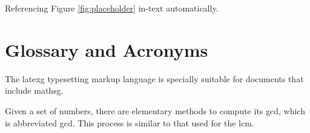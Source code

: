 \documentclass[11pt,fleqn]{book} %
\begin{document}
Referencing Figure \ref{fig:placeholder} in-text automatically.



\section{Glossary and Acronyms}


The \Gls{latexg} typesetting markup language is specially suitable 
for documents that include \gls{mathsg}. 


Given a set of numbers, there are elementary methods to compute 
its \acrlong{gcd}, which is abbreviated \acrshort{gcd}. This 
process is similar to that used for the \acrfull{lcm}.


\fancyhead[LE,LO]{\sffamily\normalsize\thepage} %
\fancyhead[RE,RO]{\textbf \bibname} %
\printbibliography[title=Literaturverzeichnis]


\printglossary[type=\acronymtype,title={Abkürzungsverzeichnis}]


\printglossary


\cleardoublepage %
\setlength{\columnsep}{0.75cm} %
\printindex %

\end{document}
